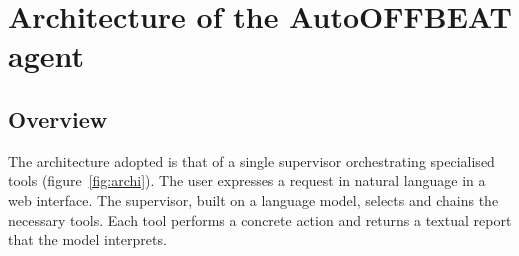 \chapter{Architecture of the AutoOFFBEAT agent}

\section{Overview}

The architecture adopted is that of a single supervisor orchestrating
specialised tools (figure~\ref{fig:archi}). The user expresses a request in
natural language in a web interface. The supervisor, built on a language model,
selects and chains the necessary tools. Each tool performs a concrete action and
returns a textual report that the model interprets.

